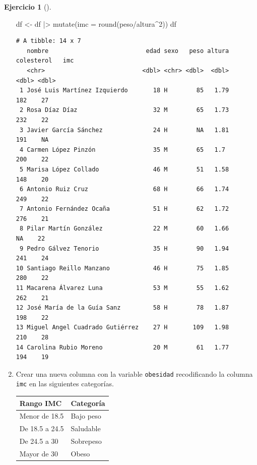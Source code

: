 \documentclass[
  a4paper,
]{scrreport}
\newenvironment{Shaded}{\begin{snugshade}}{\end{snugshade}}
\newcommand{\AttributeTok}[1]{\textcolor[rgb]{0.40,0.45,0.13}{#1}}
\newcommand{\DecValTok}[1]{\textcolor[rgb]{0.68,0.00,0.00}{#1}}
\newcommand{\FunctionTok}[1]{\textcolor[rgb]{0.28,0.35,0.67}{#1}}
\newcommand{\NormalTok}[1]{\textcolor[rgb]{0.00,0.23,0.31}{#1}}
\newcommand{\OtherTok}[1]{\textcolor[rgb]{0.00,0.23,0.31}{#1}}
\newcommand{\SpecialCharTok}[1]{\textcolor[rgb]{0.37,0.37,0.37}{#1}}
\theoremstyle{definition}
\newtheorem{exercise}{Ejercicio}[chapter]
\theoremstyle{remark}
\begin{document}
\begin{exercise}[]
\begin{enumerate}
\begin{tcolorbox}
\begin{Shaded}
\begin{Highlighting}[]
\NormalTok{df }\OtherTok{\textless{}{-}}\NormalTok{ df }\SpecialCharTok{|\textgreater{}}
    \FunctionTok{mutate}\NormalTok{(}\AttributeTok{imc =} \FunctionTok{round}\NormalTok{(peso}\SpecialCharTok{/}\NormalTok{altura}\SpecialCharTok{\^{}}\DecValTok{2}\NormalTok{))}
\NormalTok{df}
\end{Highlighting}
\end{Shaded}

\begin{verbatim}
# A tibble: 14 x 7
   nombre                           edad sexo   peso altura colesterol   imc
   <chr>                           <dbl> <chr> <dbl>  <dbl>      <dbl> <dbl>
 1 José Luis Martínez Izquierdo       18 H        85   1.79        182    27
 2 Rosa Díaz Díaz                     32 M        65   1.73        232    22
 3 Javier García Sánchez              24 H        NA   1.81        191    NA
 4 Carmen López Pinzón                35 M        65   1.7         200    22
 5 Marisa López Collado               46 M        51   1.58        148    20
 6 Antonio Ruiz Cruz                  68 H        66   1.74        249    22
 7 Antonio Fernández Ocaña            51 H        62   1.72        276    21
 8 Pilar Martín González              22 M        60   1.66         NA    22
 9 Pedro Gálvez Tenorio               35 H        90   1.94        241    24
10 Santiago Reillo Manzano            46 H        75   1.85        280    22
11 Macarena Álvarez Luna              53 M        55   1.62        262    21
12 José María de la Guía Sanz         58 H        78   1.87        198    22
13 Miguel Angel Cuadrado Gutiérrez    27 H       109   1.98        210    28
14 Carolina Rubio Moreno              20 M        61   1.77        194    19
\end{verbatim}

  \end{tcolorbox}
\item
  Crear una nueva columna con la variable \texttt{obesidad}
  recodificando la columna \texttt{imc} en las siguientes categorías.

  \begin{longtable}[]{@{}ll@{}}
  \toprule\noalign{}
  Rango IMC & Categoría \\
  \midrule\noalign{}
  \endhead
  \bottomrule\noalign{}
  \endlastfoot
  Menor de 18.5 & Bajo peso \\
  De 18.5 a 24.5 & Saludable \\
  De 24.5 a 30 & Sobrepeso \\
  Mayor de 30 & Obeso \\
  \end{longtable}


\end{enumerate}
\end{exercise}
\end{document}
